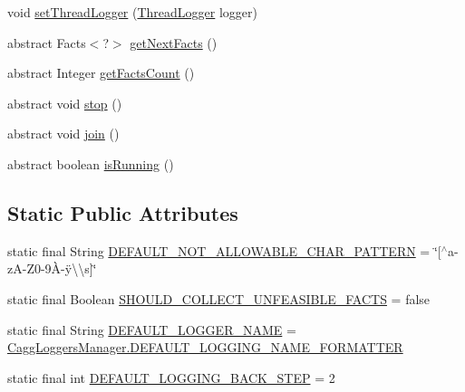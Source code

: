 \begin{DoxyCompactItemize}
void \hyperlink{classit_1_1emarolab_1_1cagg_1_1core_1_1evaluation_1_1inputFormatting_1_1InputFormatterBase_a3c281b4318735e688e17b04dbe679b35}{set\-Thread\-Logger} (\hyperlink{classit_1_1emarolab_1_1cagg_1_1core_1_1evaluation_1_1CaggThread_1_1ThreadLogger}{Thread\-Logger} logger)
\item 
abstract Facts$<$?$>$ \hyperlink{classit_1_1emarolab_1_1cagg_1_1core_1_1evaluation_1_1inputFormatting_1_1InputFormatterBase_a3d61388a9e9c1c28c239c439a98f1b12}{get\-Next\-Facts} ()
\item 
abstract Integer \hyperlink{classit_1_1emarolab_1_1cagg_1_1core_1_1evaluation_1_1inputFormatting_1_1InputFormatterBase_a0d5f6227c169da4fee8d565e65e9d966}{get\-Facts\-Count} ()
\item 
abstract void \hyperlink{classit_1_1emarolab_1_1cagg_1_1core_1_1evaluation_1_1inputFormatting_1_1InputFormatterBase_a24ecb9690d401b9ab82348f0706c883c}{stop} ()
\item 
abstract void \hyperlink{classit_1_1emarolab_1_1cagg_1_1core_1_1evaluation_1_1inputFormatting_1_1InputFormatterBase_a67f27a07e691b48723d9215a121f856c}{join} ()
\item 
abstract boolean \hyperlink{classit_1_1emarolab_1_1cagg_1_1core_1_1evaluation_1_1inputFormatting_1_1InputFormatterBase_a62e55e7f688e6a7bb4a609b0223ab32f}{is\-Running} ()
\end{DoxyCompactItemize}
\subsection*{Static Public Attributes}
\begin{DoxyCompactItemize}
\item 
static final String \hyperlink{classit_1_1emarolab_1_1cagg_1_1core_1_1evaluation_1_1inputFormatting_1_1InputFormatterBase_adf3331e78254ec6ad1861f8b6eab4b36}{D\-E\-F\-A\-U\-L\-T\-\_\-\-N\-O\-T\-\_\-\-A\-L\-L\-O\-W\-A\-B\-L\-E\-\_\-\-C\-H\-A\-R\-\_\-\-P\-A\-T\-T\-E\-R\-N} = \char`\"{}\mbox{[}$^\wedge$a-\/z\-A-\/Z0-\/9À-\/ÿ\textbackslash{}\textbackslash{}s\mbox{]}\char`\"{}
\item 
static final Boolean \hyperlink{classit_1_1emarolab_1_1cagg_1_1core_1_1evaluation_1_1inputFormatting_1_1InputFormatterBase_af5b6a6b6365e2b1b87cbe400dfcecb78}{S\-H\-O\-U\-L\-D\-\_\-\-C\-O\-L\-L\-E\-C\-T\-\_\-\-U\-N\-F\-E\-A\-S\-I\-B\-L\-E\-\_\-\-F\-A\-C\-T\-S} = false
\item 
static final String \hyperlink{classit_1_1emarolab_1_1cagg_1_1core_1_1evaluation_1_1inputFormatting_1_1InputFormatterBase_a2aec950b8b5c2ad209cf2ff729490321}{D\-E\-F\-A\-U\-L\-T\-\_\-\-L\-O\-G\-G\-E\-R\-\_\-\-N\-A\-M\-E} = \hyperlink{classit_1_1emarolab_1_1cagg_1_1debugging_1_1CaggLoggersManager_a8d1bf14ebce8a765bf0e3bb3c297f268}{Cagg\-Loggers\-Manager.\-D\-E\-F\-A\-U\-L\-T\-\_\-\-L\-O\-G\-G\-I\-N\-G\-\_\-\-N\-A\-M\-E\-\_\-\-F\-O\-R\-M\-A\-T\-T\-E\-R}
\item 
static final int \hyperlink{classit_1_1emarolab_1_1cagg_1_1core_1_1evaluation_1_1inputFormatting_1_1InputFormatterBase_ab1f65b76eb468d3c59c35ac207859fdd}{D\-E\-F\-A\-U\-L\-T\-\_\-\-L\-O\-G\-G\-I\-N\-G\-\_\-\-B\-A\-C\-K\-\_\-\-S\-T\-E\-P} = 2
\end{DoxyCompactItemize}
